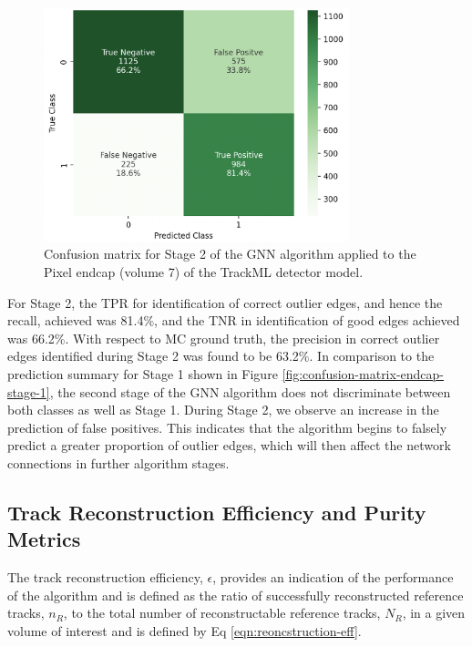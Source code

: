 \begin{figure}[htbp]
    \centering
    \includegraphics[width=0.79\textwidth]{images/7-results/confusion_matrix_endcap_stage_2.png}
    \caption{Confusion matrix for Stage 2 of the GNN algorithm applied to the Pixel endcap (volume 7) of the TrackML detector model.}
    \label{fig:confusion-matrix-endcap-stage-2}%
\end{figure}


For Stage 2, the TPR for identification of correct outlier edges, and hence the recall, achieved was 81.4\%, and the TNR in identification of good edges achieved was 66.2\%. With respect to MC ground truth, the precision in correct outlier edges identified during Stage 2 was found to be 63.2\%. In comparison to the prediction summary for Stage 1 shown in Figure \ref{fig:confusion-matrix-endcap-stage-1}, the second stage of the GNN algorithm does not discriminate between both classes as well as Stage 1. During Stage 2, we observe an increase in the prediction of false positives. This indicates that the algorithm begins to falsely predict a greater proportion of outlier edges, which will then affect the network connections in further algorithm stages.






\subsection{Track Reconstruction Efficiency and Purity Metrics}

The track reconstruction efficiency, $\epsilon$, provides an indication of the performance of the algorithm and is defined as the ratio of successfully reconstructed reference tracks, $n_R$, to the total number of reconstructable reference tracks, $N_R$, in a given volume of interest and is defined by Eq \eqref{eqn:reoncstruction-eff}. 


